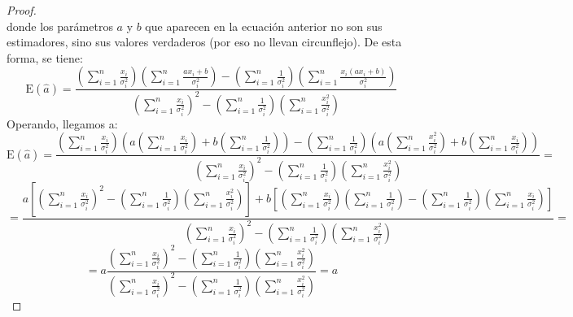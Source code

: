 \documentclass[11pt,a4paper,spanish]{article}
\numberwithin{equation}{section}
\numberwithin{table}{section}
\numberwithin{figure}{section}
\theoremstyle{definition}
\theoremstyle{remark}
\theoremstyle{definition}
\theoremstyle{remark}
\theoremstyle{plain}
\theoremstyle{plain}
\theoremstyle{plain}
\theoremstyle{plain}
\theoremstyle{plain}
\theoremstyle{plain}
\begin{document}
\begin{proof}
\begin{equation}
		\end{equation}
		donde los parámetros $a$ y $b$ que aparecen en la ecuación anterior
		no son sus estimadores, sino sus valores verdaderos (por eso no llevan
		circunflejo). De esta forma, se tiene:
		\[
		\mathrm{E}\left(\hat{a}\right)=\frac{\left(\sum_{i=1}^{n}\frac{x_{i}}{\sigma_{i}^{2}}\right)\left(\sum_{i=1}^{n}\frac{ax_{i}+b}{\sigma_{i}^{2}}\right)-\left(\sum_{i=1}^{n}\frac{1}{\sigma_{i}^{2}}\right)\left(\sum_{i=1}^{n}\frac{x_{i}\left(ax_{i}+b\right)}{\sigma_{i}^{2}}\right)}{\left(\sum_{i=1}^{n}\frac{x_{i}}{\sigma_{i}^{2}}\right)^{2}-\left(\sum_{i=1}^{n}\frac{1}{\sigma_{i}^{2}}\right)\left(\sum_{i=1}^{n}\frac{x_{i}^{2}}{\sigma_{i}^{2}}\right)}
		\]
		Operando, llegamos a:
		\[
		\mathrm{E}\left(\hat{a}\right)=\frac{\left(\sum_{i=1}^{n}\frac{x_{i}}{\sigma_{i}^{2}}\right)\left(a\left(\sum_{i=1}^{n}\frac{x_{i}}{\sigma_{i}^{2}}\right)+b\left(\sum_{i=1}^{n}\frac{1}{\sigma_{i}^{2}}\right)\right)-\left(\sum_{i=1}^{n}\frac{1}{\sigma_{i}^{2}}\right)\left(a\left(\sum_{i=1}^{n}\frac{x_{i}^{2}}{\sigma_{i}^{2}}\right)+b\left(\sum_{i=1}^{n}\frac{x_{i}}{\sigma_{i}^{2}}\right)\right)}{\left(\sum_{i=1}^{n}\frac{x_{i}}{\sigma_{i}^{2}}\right)^{2}-\left(\sum_{i=1}^{n}\frac{1}{\sigma_{i}^{2}}\right)\left(\sum_{i=1}^{n}\frac{x_{i}^{2}}{\sigma_{i}^{2}}\right)}=
		\]
		\[
		=\frac{a\left[\left(\sum_{i=1}^{n}\frac{x_{i}}{\sigma_{i}^{2}}\right)^{2}-\left(\sum_{i=1}^{n}\frac{1}{\sigma_{i}^{2}}\right)\left(\sum_{i=1}^{n}\frac{x_{i}^{2}}{\sigma_{i}^{2}}\right)\right]+b\left[\left(\sum_{i=1}^{n}\frac{x_{i}}{\sigma_{i}^{2}}\right)\left(\sum_{i=1}^{n}\frac{1}{\sigma_{i}^{2}}\right)-\left(\sum_{i=1}^{n}\frac{1}{\sigma_{i}^{2}}\right)\left(\sum_{i=1}^{n}\frac{x_{i}}{\sigma_{i}^{2}}\right)\right]}{\left(\sum_{i=1}^{n}\frac{x_{i}}{\sigma_{i}^{2}}\right)^{2}-\left(\sum_{i=1}^{n}\frac{1}{\sigma_{i}^{2}}\right)\left(\sum_{i=1}^{n}\frac{x_{i}^{2}}{\sigma_{i}^{2}}\right)}=
		\]
		\[
		=a\frac{\left(\sum_{i=1}^{n}\frac{x_{i}}{\sigma_{i}^{2}}\right)^{2}-\left(\sum_{i=1}^{n}\frac{1}{\sigma_{i}^{2}}\right)\left(\sum_{i=1}^{n}\frac{x_{i}^{2}}{\sigma_{i}^{2}}\right)}{\left(\sum_{i=1}^{n}\frac{x_{i}}{\sigma_{i}^{2}}\right)^{2}-\left(\sum_{i=1}^{n}\frac{1}{\sigma_{i}^{2}}\right)\left(\sum_{i=1}^{n}\frac{x_{i}^{2}}{\sigma_{i}^{2}}\right)}=a
		\]
		

\end{proof}
\end{document}
